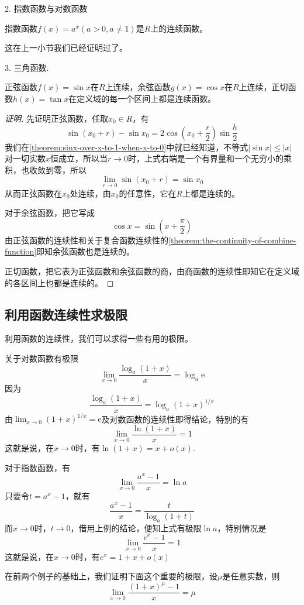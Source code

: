 2. 指数函数与对数函数
\begin{theorem}
  指数函数$f(x)=a^x(a>0,a\neq 1)$是$R$上的连续函数。
\end{theorem}

这在上一小节我们已经证明过了。

3. 三角函数.
\begin{theorem}
  正弦函数$f(x)=\sin{x}$在$R$上连续，余弦函数$g(x)=\cos{x}$在$R$上连续，正切函数$h(x)=\tan{x}$在定义域的每一个区间上都是连续函数。
\end{theorem}

\begin{proof}[证明]
  先证明正弦函数，任取$x_0 \in R$，有
  \[ \sin{(x_0+r)} - \sin{x_0} = 2\cos{ \left( x_0 + \frac{r}{2} \right) }\sin{ \frac{h}{2} } \]
  我们在\autoref{theorem:sinx-over-x-to-1-when-x-to-0}中就已经知道，不等式$|\sin{x}| \leqslant |x|$对一切实数$x$恒成立，所以当$r \to 0$时，上式右端是一个有界量和一个无穷小的乘积，也收敛到零，所以
  \[ \lim_{r \to 0} \sin{(x_0+r)} = \sin{x_0} \]
  从而正弦函数在$x_0$处连续，由$x_0$的任意性，它在$R$上都是连续的。

  对于余弦函数，把它写成
  \[ \cos{x} = \sin{ \left( x+\frac{\pi}{2} \right) } \]
  由正弦函数的连续性和关于复合函数连续性的\autoref{theorem:the-continuity-of-combine-function}即知余弦函数也是连续的。

  正切函数，把它表为正弦函数和余弦函数的商，由商函数的连续性即知它在定义域的各区间上也都是连续的。
\end{proof}


\subsection{利用函数连续性求极限}
\label{sec:find-limit-by-continuousness}

利用函数的连续性，我们可以求得一些有用的极限。

\begin{example}
  \label{example:ln-1+x-equaliant-to-x}
  关于对数函数有极限
  \[ \lim_{x \to 0} \frac{\log_a(1+x)}{x} = \log_a \mathrm{e} \]
  因为
  \[ \frac{\log_a(1+x)}{x} = \log_a (1+x)^{1/x} \]
  由$\lim_{x \to 0} (1+x)^{1/x} = \mathrm{e}$及对数函数的连续性即得结论，特别的有
  \[ \lim_{x \to 0} \frac{\ln(1+x)}{x} = 1 \]
  这就是说，在$x \to 0$时，有$\ln(1+x)=x+o(x)$.
\end{example}

\begin{example}
  \label{example:e-power-x-1-equalitant-to-x}
  对于指数函数，有
  \[ \lim_{x \to 0} \frac{a^x-1}{x} = \ln{a} \]
  只要令$t=a^x-1$，就有
  \[ \frac{a^x-1}{x} = \frac{t}{\log_a(1+t)} \]
  而$x \to 0$时，$t \to 0$，借用上例的结论，便知上式有极限$\ln{a}$，特别情况是
  \[ \lim_{x \to 0} \frac{e^x-1}{x} = 1 \]
  这就是说，在$x \to 0$时，有$e^x=1+x+o(x)$
\end{example}

\begin{example}
  \label{example:1-plus-x-power-subtract-1-equalitant-to-x}
  在前两个例子的基础上，我们证明下面这个重要的极限，设$\mu$是任意实数，则
  \[ \lim_{x \to 0} \frac{(1+x)^{\mu}-1}{x} = \mu \]
\end{example}

